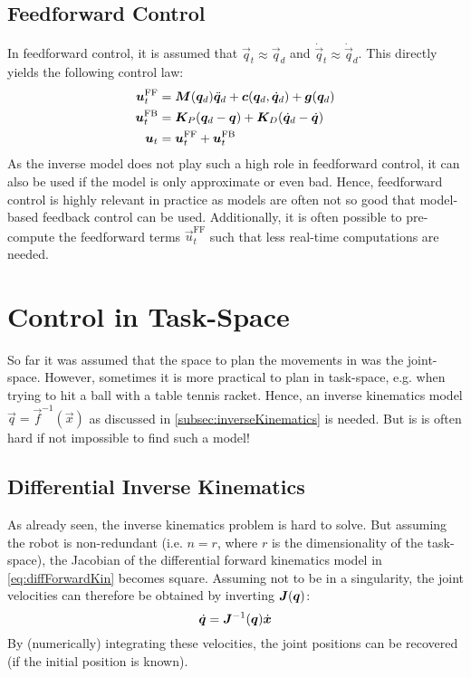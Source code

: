 		\subsection{Feedforward Control}
			In feedforward control, it is assumed that \( \vec{q}_t \approx \vec{q}_d \) and \( \dot{\vec{q}}_t \approx \dot{\vec{q}}_d \). This directly yields the following control law:
			\begin{align*}
				\bm{u}_t^\mathrm{FF} & = \bm{M}(\bm{q}_d) \ddot{\bm{q}}_d + \bm{c}(\bm{q}_d, \dot{\bm{q}}_d) + \bm{g}(\bm{q}_d) \\
				\bm{u}_t^\mathrm{FB} & = \bm{K}_P (\bm{q}_d - \bm{q}) + \bm{K}_D (\dot{\bm{q}}_d - \dot{\bm{q}})                  \\
				\bm{u}_t             & = \bm{u}_t^\mathrm{FF} + \bm{u}_t^\mathrm{FB}
			\end{align*}
			As the inverse model does not play such a high role in feedforward control, it can also be used if the model is only approximate or even bad. Hence, feedforward control is highly relevant in practice as models are often not so good that model-based feedback control can be used. Additionally, it is often possible to pre-compute the feedforward terms \( \vec{u}_t^\mathrm{FF} \) such that less real-time computations are needed.

	\section{Control in Task-Space}
		So far it was assumed that the space to plan the movements in was the joint-space. However, sometimes it is more practical to plan in task-space, e.g. when trying to hit a ball with a table tennis racket. Hence, an inverse kinematics model \( \vec{q} = \vec{f}^{-1}(\vec{x}) \) as discussed in \autoref{subsec:inverseKinematics} is needed. But is is often hard if not impossible to find such a model!

		\subsection{Differential Inverse Kinematics}
			As already seen, the inverse kinematics problem is hard to solve. But assuming the robot is non-redundant (i.e. \( n = r \), where \(r\) is the dimensionality of the task-space), the Jacobian of the differential forward kinematics model in \eqref{eq:diffForwardKin} becomes square. Assuming not to be in a singularity, the joint velocities can therefore be obtained by inverting \( \bm{J}(\bm{q}) \):
			\begin{equation*}
				\dot{\bm{q}} = \bm{J}^{-1}(\bm{q}) \dot{\bm{x}}
			\end{equation*}
			By (numerically) integrating these velocities, the joint positions can be recovered (if the initial position is known).

